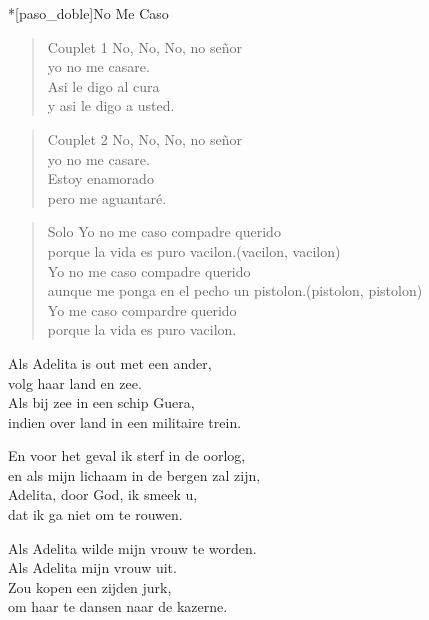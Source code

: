 \clearpage
\begin{song}*[paso_doble]{No Me Caso}
\begin{verse}{Couplet 1}
No, No, No, no se\~nor\\
yo no me casare.\\
Asi le digo al cura\\
y asi le digo a usted.\\
\end{verse}
\begin{verse}{Couplet 2}
No, No, No, no se\~nor\\
yo no me casare.\\
Estoy enamorado\\
pero me aguantaré.\\
\end{verse}

\begin{verse}{Solo}
 Yo no me caso compadre querido\\
porque la vida es puro vacilon.\hspace{8em}(vacilon, vacilon)\\
\chord{\hspace{1pt}}Yo no me caso compadre querido\\
aunque me ponga en el pecho un pistolon.\hspace{3em}(pistolon, pistolon)\\
\chord{\hspace{1pt}}Yo me caso compardre querido\\
porque la vida es puro vacilon.\\
\end{verse}

\end{song}

\clearpage
\begin{translation}[Adelita]
Als Adelita is out met een ander,\\
volg haar land en zee.\\
Als bij zee in een schip Guera,\\
indien over land in een militaire trein.\vspace{\wlskip}

En voor het geval ik sterf in de oorlog,\\
en als mijn lichaam in de bergen zal zijn,\\
Adelita, door God, ik smeek u,\\
dat ik ga niet om te rouwen.\vspace{\wlskip}

Als Adelita wilde mijn vrouw te worden.\\
Als Adelita mijn vrouw uit.\\
Zou kopen een zijden jurk,\\
om haar te dansen naar de kazerne.
\end{translation}

